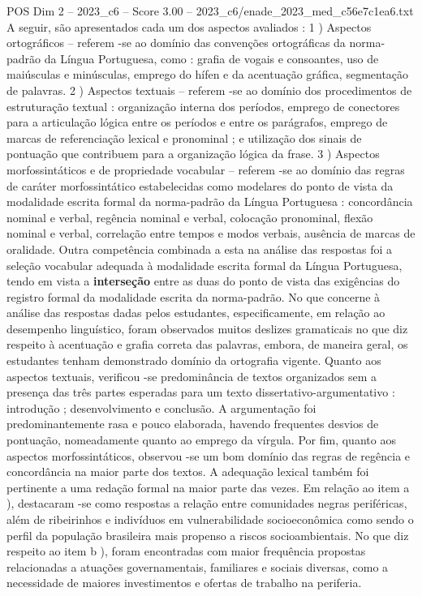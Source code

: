 \begin{textsample}{POS Dim 2 – 2023\_c6 – Score 3.00 – 2023\_c6/enade\_2023\_med\_c56e7c1ea6.txt}
A seguir, são apresentados cada um dos aspectos avaliados : 1 ) Aspectos ortográficos – referem -se ao domínio das convenções ortográficas da norma-padrão da Língua Portuguesa, como : grafia de vogais e consoantes, uso de maiúsculas e minúsculas, emprego do hífen e da acentuação gráfica, segmentação de palavras. 2 ) Aspectos textuais – referem -se ao domínio dos procedimentos de estruturação textual : organização interna dos períodos, emprego de conectores para a articulação lógica entre os períodos e entre os parágrafos, emprego de marcas de referenciação lexical e pronominal ; e utilização dos sinais de pontuação que contribuem para a organização lógica da frase. 3 ) Aspectos morfossintáticos e de propriedade vocabular – referem -se ao domínio das regras de caráter morfossintático estabelecidas como modelares do ponto de vista da modalidade escrita formal da norma-padrão da Língua Portuguesa : concordância nominal e verbal, regência nominal e verbal, colocação pronominal, flexão nominal e verbal, correlação entre tempos e modos verbais, ausência de marcas de oralidade.
Outra competência combinada a esta na análise das respostas foi a seleção vocabular adequada à modalidade escrita formal da Língua Portuguesa, tendo em vista a \textbf{interseção} entre as duas do ponto de vista das exigências do registro formal da modalidade escrita da norma-padrão.
No que concerne à análise das respostas dadas pelos estudantes, especificamente, em relação ao desempenho linguístico, foram observados muitos deslizes gramaticais no que diz respeito à acentuação e grafia correta das palavras, embora, de maneira geral, os estudantes tenham demonstrado domínio da ortografia vigente.
Quanto aos aspectos textuais, verificou -se predominância de textos organizados sem a presença das três partes esperadas para um texto dissertativo-argumentativo : introdução ; desenvolvimento e conclusão.
A argumentação foi predominantemente rasa e pouco elaborada, havendo frequentes desvios de pontuação, nomeadamente quanto ao emprego da vírgula.
Por fim, quanto aos aspectos morfossintáticos, observou -se um bom domínio das regras de regência e concordância na maior parte dos textos.
A adequação lexical também foi pertinente a uma redação formal na maior parte das vezes.
Em relação ao item a ), destacaram -se como respostas a relação entre comunidades negras periféricas, além de ribeirinhos e indivíduos em vulnerabilidade socioeconômica como sendo o perfil da população brasileira mais propenso a riscos socioambientais.
No que diz respeito ao item b ), foram encontradas com maior frequência propostas relacionadas a atuações governamentais, familiares e sociais diversas, como a necessidade de maiores investimentos e ofertas de trabalho na periferia.

\end{textsample}
